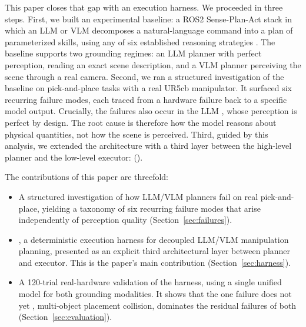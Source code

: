 This paper closes that gap with an execution harness. We proceeded
in three steps. First, we built an experimental baseline: a ROS2
Sense-Plan-Act stack in which an LLM or VLM decomposes a
natural-language command into a plan of parameterized skills, using any
of six established reasoning strategies \cite{favaliRAS}. The baseline
supports two grounding regimes: an LLM planner with perfect perception,
reading an exact scene description, and a VLM planner perceiving the
scene through a real camera. Second, we ran a structured investigation
of the baseline on pick-and-place tasks with a real UR5cb manipulator.
It surfaced six recurring failure modes, each traced from a hardware
failure back to a specific model output. Crucially, the failures also
occur in the LLM , whose perception is perfect by
design. The root cause is therefore how the model reasons about
physical quantities, not how the scene is perceived. Third, guided by
this analysis, we extended the architecture with a third layer between
the high-level planner and the low-level executor: \harness{}
(\harnesslong{}). 

The contributions of this paper are threefold:
\begin{itemize}
  \item A structured investigation of how LLM/VLM
    planners fail on real pick-and-place, yielding a
    taxonomy of six recurring failure modes that arise independently
    of perception quality (Section~\ref{sec:failures}).
  \item \harness{}, a deterministic execution harness for decoupled
    LLM/VLM manipulation planning, presented as an explicit third
    architectural layer between planner and executor. This is the
    paper's main contribution (Section~\ref{sec:harness}).
  \item A 120-trial real-hardware validation of the harness,
    using a single unified model for both grounding modalities. It
    shows that the one failure \harness{} does not yet ,
    multi-object placement collision, dominates the residual failures
    of both  (Section~\ref{sec:evaluation}).
\end{itemize}

